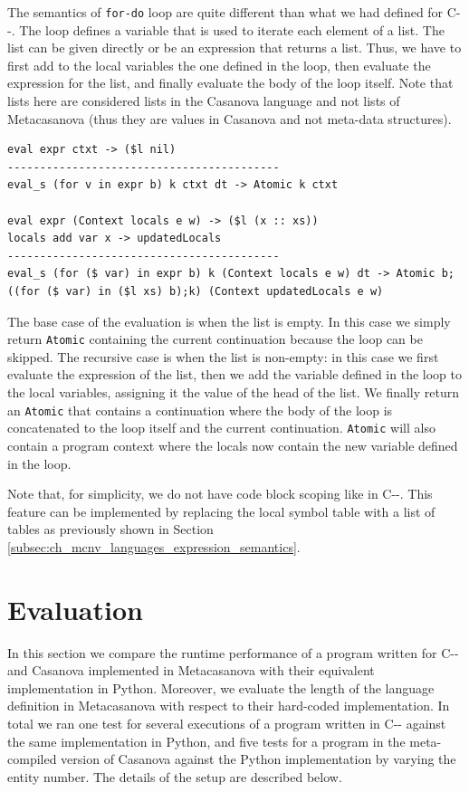 \noindent
The semantics of \texttt{for-do} loop are quite different than what we had defined for C-{}-. The loop defines a variable that is used to iterate each element of a list. The list can be given directly or be an expression that returns a list. Thus, we have to first add to the local variables the one defined in the loop, then evaluate the expression for the list, and finally evaluate the body of the loop itself. Note that lists here are considered lists in the Casanova language and not lists of Metacasanova (thus they are values in Casanova and not meta-data structures).

\begin{lstlisting}
eval expr ctxt -> ($l nil)
------------------------------------------
eval_s (for v in expr b) k ctxt dt -> Atomic k ctxt

eval expr (Context locals e w) -> ($l (x :: xs))
locals add var x -> updatedLocals
------------------------------------------
eval_s (for ($ var) in expr b) k (Context locals e w) dt -> Atomic b;((for ($ var) in ($l xs) b);k) (Context updatedLocals e w)
\end{lstlisting}

\noindent
The base case of the evaluation is when the list is empty. In this case we simply return \texttt{Atomic} containing the current continuation because the loop can be skipped. The recursive case is when the list is non-empty: in this case we first evaluate the expression of the list, then we add the variable defined in the loop to the local variables, assigning it the value of the head of the list. We finally return an \texttt{Atomic} that contains a continuation where the body of the loop is concatenated to the loop itself and the current continuation. \texttt{Atomic} will also contain a program context where the locals now contain the new variable defined in the loop.

Note that, for simplicity, we do not have code block scoping like in C-{}-. This feature can be implemented by replacing the local symbol table with a list of tables as previously shown in Section \ref{subsec:ch_mcnv_languages_expression_semantics}.

\section{Evaluation}
\label{sec:ch_mcnv_languages_evaluation}
In this section we compare the runtime performance of a program written for C-{}- and Casanova implemented in Metacasanova with their equivalent implementation in Python. Moreover, we evaluate the length of the language definition in Metacasanova with respect to their hard-coded implementation. In total we ran one test for several executions of a program written in C-{}- against the same implementation in Python, and five tests for a program in the meta-compiled version of Casanova against the Python implementation by varying the entity number. The details of the setup are described below.


